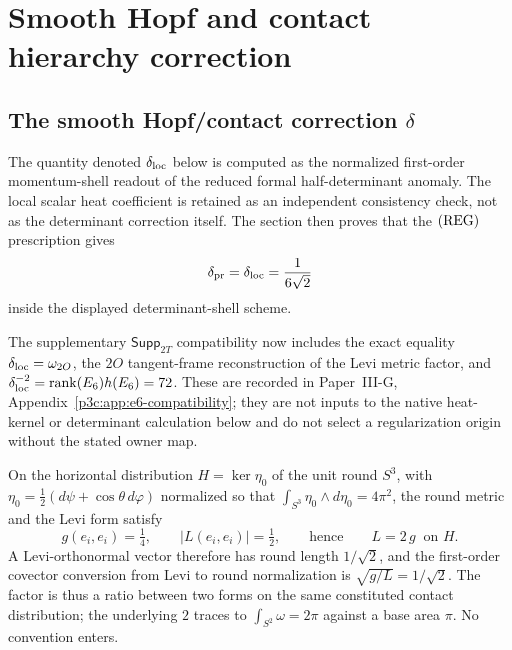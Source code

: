 \documentclass[12pt,a4paper]{article}
\begin{document}
\section{Smooth Hopf and contact hierarchy correction}
\label{paper3c:sec:organized-contact}
\subsection{\texorpdfstring{The smooth Hopf/contact correction \(\delta\)}{The smooth Hopf/contact correction}}
\label{p3:sec:delta}

The quantity denoted \(\delta_{\rm loc}\) below is computed as the normalized
first-order momentum-shell readout of the reduced formal half-determinant anomaly.
The local scalar heat coefficient is retained as an independent consistency
check, not as the determinant correction itself.  The section then proves that
the \(({\rm REG})\) prescription gives
\[
  \delta_{\rm pr}=\delta_{\rm loc}=\frac{1}{6\sqrt2}
\]
inside the displayed determinant-shell scheme.

The supplementary \(\mathsf{Supp}_{2T}\) compatibility now includes the
exact equality \(\delta_{\rm loc}=\omega_{2O}\), the \(2O\) tangent-frame
reconstruction of the Levi metric factor, and
\(\delta_{\rm loc}^{-2}=\operatorname{rank}(E_6)h(E_6)=72\).  These are
recorded in Paper~III-G, Appendix~\ref{p3c:app:e6-compatibility}; they are not inputs to
the native heat-kernel or determinant calculation below and do not select a
regularization origin without the stated owner map.

\begin{remark}
\label{p3:rem:levi-round-factor}
On the horizontal distribution \(H=\ker\eta_0\) of the unit round \(S^3\),
with \(\eta_0=\tfrac12(d\psi+\cos\theta\,d\varphi)\) normalized so that
\(\int_{S^3}\eta_0\wedge d\eta_0=4\pi^2\), the round metric and the Levi form
satisfy
\[
        g(e_i,e_i)=\tfrac14,
        \qquad
        \lvert L(e_i,e_i)\rvert=\tfrac12,
        \qquad\text{hence}\qquad
        L=2\,g\ \text{ on } H .
\]
A Levi-orthonormal vector therefore has round length \(1/\sqrt2\), and the
first-order covector conversion from Levi to round normalization is
\(\sqrt{g/L}=1/\sqrt2\).  The factor is thus a ratio between two forms on the
same constituted contact distribution; the underlying \(2\) traces to
\(\int_{S^2}\omega=2\pi\) against a base area \(\pi\).  No convention enters.
\end{remark}
\end{document}
